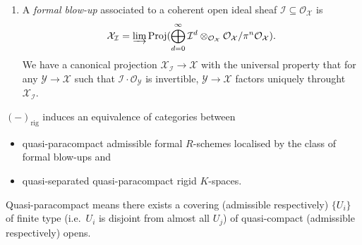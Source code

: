 \documentclass[a4paper]{article}
\newcommand{\sh}[1]{\mathcal{#1}} %
\begin{document}
\begin{enumerate}
\item A \emph{formal blow-up} associated to a coherent open ideal sheaf \(\sh I \subseteq \sh O_{\mathcal X}\) is
  \[
    \mathcal X_{\sh I} = \varinjlim \mathrm{Proj} (\bigoplus_{d = 0}^\infty \sh I^d \otimes_{\sh O_{\mathcal X}} \sh O_{\mathcal X}/\pi^n \sh O_{\mathcal X}).
  \]
  We have a canonical projection \(\mathcal X_{\sh I} \to \mathcal X\) with the universal property that for any \(\mathcal Y \to \mathcal X\) such that \(\sh I \cdot \sh O_{\mathcal{Y}}\) is invertible, \(\mathcal{Y} \to \mathcal{X}\) factors uniquely throught \(\mathcal{X}_{\sh I}\).
\end{enumerate}

\begin{theorem}[Raynaud]
  \((-)_{\mathrm{rig}}\) induces an equivalence of categories between
  \begin{itemize}
  \item quasi-paracompact admissible formal \(R\)-schemes localised by the class of formal blow-ups and
  \item quasi-separated quasi-paracompact rigid \(K\)-spaces.
  \end{itemize}

  Quasi-paracompact means there exists a covering (admissible respectively) \(\{U_i\}\) of finite type (i.e.\ \(U_i\) is disjoint from almost all \(U_j\)) of quasi-compact (admissible respectively) opens.
\end{theorem}













\printindex
\end{document}
